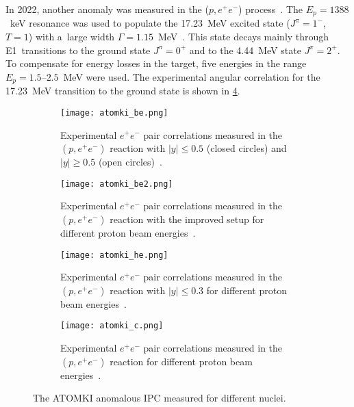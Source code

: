 			In 2022, another anomaly was measured in the ($p,e^+e^-$) process~\cite{atomki_c}. The $E_p = 1388$~keV resonance was used to populate the 17.23~MeV excited state ($J^\pi = 1^-$, $T = 1$) with a~large width $\Gamma = 1.15$~MeV~\cite{resonances3}. This state decays mainly through E1~transitions to the ground state $J^\pi = 0^+$ and to the 4.44~MeV state $J^\pi = 2^+$. To compensate for energy losses in the target, five energies in the range $E_p = 1.5\text{--}2.5$~MeV were used. The experimental angular correlation for the 17.23~MeV transition to the ground state is shown in \cref{fig:atomki_c}.
			
				\begin{figure}
					\centering
					\begin{subfigure}[t]{0.48\textwidth}
						\centering
						\texttt{[image: atomki\_be.png]}
						\caption{Experimental $e^+e^-$ pair correlations measured in the $(p,e^+e^-)$ reaction with $|y| \leq 0.5$ (closed circles) and $|y| \geq 0.5$ (open circles)~\cite{atomki_be}.}
						\label{fig:atomki_be}
					\end{subfigure}
					\hfill
					\begin{subfigure}[t]{0.42\textwidth}
						\centering
						\texttt{[image: atomki\_be2.png]}
						\caption{Experimental $e^+e^-$ pair correlations measured in the $(p,e^+e^-)$ reaction with the improved setup for different proton beam energies~\cite{atomki_be2}.}
						\label{fig:atomki_be2}
					\end{subfigure}
					\begin{subfigure}[t]{0.45\textwidth}
						\centering
						\texttt{[image: atomki\_he.png]}
						\caption{Experimental $e^+e^-$ pair correlations measured in the $(p,e^+e^-)$ reaction with $|y| \leq 0.3$ for different proton beam energies~\cite{atomki_he2}.}
						\label{fig:atomki_he}
					\end{subfigure}
					\hfill
					\begin{subfigure}[t]{0.45\textwidth}
						\centering
						\texttt{[image: atomki\_c.png]}
						\caption{Experimental $e^+e^-$ pair correlations measured in the $(p,e^+e^-)$ reaction for different proton beam energies~\cite{atomki_c}.}
						\label{fig:atomki_c}
					\end{subfigure}
					\caption{The ATOMKI anomalous \ac{IPC} measured for different nuclei.}
					\label{fig:atomki}
				\end{figure}
			
